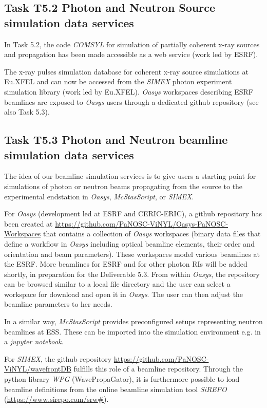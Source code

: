 \documentclass[11pt]{article}
\begin{document}
\subsection{Task T5.2 Photon and Neutron Source simulation data services}
\label{sec:org7132d36}
In Task 5.2, the code \emph{COMSYL} for simulation of partially coherent x-ray sources
and propagation has been made accessible as a web service (work led by ESRF).

The x-ray pulses simulation database for coherent x-ray source simulations at
Eu.XFEL and can now be accessed from the \emph{SIMEX} photon experiment simulation
library (work led by Eu.XFEL). \emph{Oasys} workspaces describing ESRF beamlines are
exposed to \emph{Oasys} users through a dedicated github repository (see also Task
5.3).

\subsection{Task T5.3 Photon and Neutron beamline simulation data services}
\label{sec:org1cdc0b1}
The idea of our
beamline simulation services is to give users a starting point for simulations
of photon or neutron beams propagating from the source to the experimental
endstation in \emph{Oasys}, \emph{McStasScript}, or \emph{SIMEX}.

For \emph{Oasys} (development led at ESRF and CERIC-ERIC), a github repository has
been created at \href{https://github.com/PaNOSC-ViNYL/Oasys-PaNOSC-Workspaces}{https://github.com/PaNOSC-ViNYL/Oasys-PaNOSC-Workspaces} that
contains a collection of \emph{Oasys} workspaces (binary data files that define a
workflow in \emph{Oasys} including optical beamline elements, their order and
orientation and beam parameters). These workspaces model various beamlines at
the ESRF. More beamlines for ESRF and for other photon RIs will be added
shortly, in preparation for the Deliverable 5.3. From within \emph{Oasys}, the
repository can be browsed similar to a local file directory and the user can
select a workspace for download and open it in \emph{Oasys}. The user can then
adjust the beamline parameters to her needs.

In a similar way, \emph{McStasScript} provides preconfigured setups representing
neutron beamlines at ESS. These can be imported into the simulation environment
e.g. in a \emph{jupyter notebook}.

For \emph{SIMEX}, the github
repository \href{https://github.com/PaNOSC-ViNYL/wavefrontDB}{https://github.com/PaNOSC-ViNYL/wavefrontDB} fulfills this role of a
beamline repository. Through the python library \emph{WPG} (WavePropaGator), it is furthermore possible
to load beamline definitions from the online beamline simulation tool \emph{SiREPO}
(\href{https://www.sirepo.com/srw\#}{https://www.sirepo.com/srw\#}).
\end{document}
